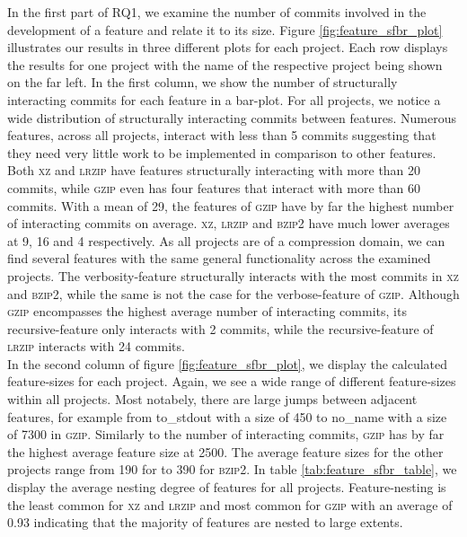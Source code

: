 In the first part of RQ1, we examine the number of commits involved in the development of a feature and relate it to its size.
Figure \ref{fig:feature_sfbr_plot} illustrates our results in three different plots for each project.
Each row displays the results for one project with the name of the respective project being shown on the far left. 
In the first column, we show the number of structurally interacting commits for each feature in a bar-plot.
For all projects, we notice a wide distribution of structurally interacting commits between features.
Numerous features, across all projects, interact with less than 5 commits suggesting that they need very little work to be implemented in comparison to other features.
Both \textsc{xz} and \textsc{lrzip} have features structurally interacting with more than 20 commits, while \textsc{gzip} even has four features that interact with more than 60 commits.
With a mean of 29, the features of \textsc{gzip} have by far the highest number of interacting commits on average.
\textsc{xz}, \textsc{lrzip} and \textsc{bzip2} have much lower averages at 9, 16 and 4 respectively.
As all projects are of a compression domain, we can find several features with the same general functionality across the examined projects.
The \textsf{verbosity}-feature structurally interacts with the most commits in \textsc{xz} and \textsc{bzip2}, while the same is not the case for the \textsf{verbose}-feature of \textsc{gzip}.
Although \textsc{gzip} encompasses the highest average number of interacting commits, its \textsf{recursive}-feature only interacts with 2 commits, while the \textsf{recursive}-feature of \textsc{lrzip} interacts with 24 commits. \\
In the second column of figure \ref{fig:feature_sfbr_plot}, we display the calculated feature-sizes for each project.
Again, we see a wide range of different feature-sizes within all projects.
Most notabely, there are large jumps between adjacent features, for example from \textsf{to\_stdout} with a size of 450 to \textsf{no\_name} with a size of 7300 in \textsc{gzip}.
Similarly to the number of interacting commits, \textsc{gzip} has by far the highest average feature size at 2500.
The average feature sizes for the other projects range from 190 for  to 390 for \textsc{bzip2}. 
In table \ref{tab:feature_sfbr_table}, we display the average nesting degree of features for all projects.
Feature-nesting is the least common for \textsc{xz} and \textsc{lrzip} and most common for \textsc{gzip} with an average of 0.93 indicating that the majority of features are nested to large extents.
